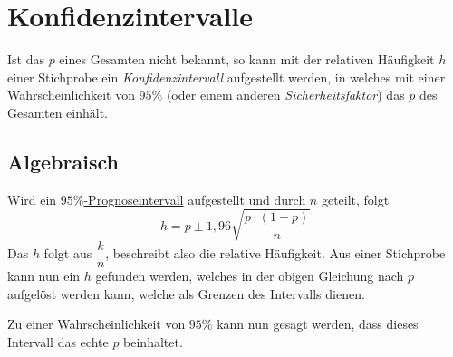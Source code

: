 \documentclass{article}
\begin{document}
\section{Konfidenzintervalle}
Ist das $p$ eines Gesamten nicht bekannt, so kann mit der relativen Häufigkeit $h$ einer Stichprobe ein \emph{Konfidenzintervall} aufgestellt werden, in welches mit einer Wahrscheinlichkeit von $95\%$ (oder einem anderen \emph{Sicherheitsfaktor}) das $p$ des Gesamten einhält.
 
\subsection{Algebraisch}
Wird ein \hyperref[Prognosen]{$95\%$-Prognoseintervall} aufgestellt und durch $n$ geteilt, folgt 
\[
 h = p \pm 1,96 \sqrt{\frac{p \cdot (1-p)}{n}}
\]
Das $h$ folgt aus $\dfrac{k}{n}$, beschreibt also die relative Häufigkeit. Aus einer Stichprobe kann nun ein $h$ gefunden werden, welches in der obigen Gleichung nach $p$ aufgelöst werden kann, welche als Grenzen des Intervalls dienen.
 
Zu einer Wahrscheinlichkeit von $95\%$ kann nun gesagt werden, dass dieses Intervall das echte $p$ beinhaltet.
\end{document}
